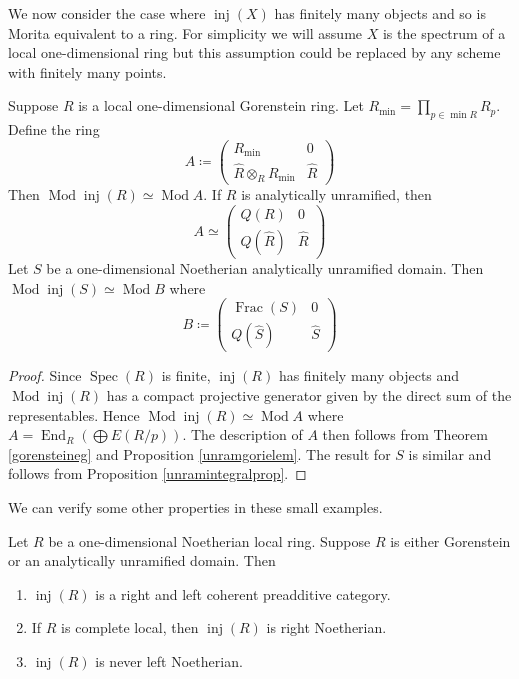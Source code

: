 \documentclass[12pt,oneside]{amsart}
\DeclareMathOperator{\End}{End}
\DeclareMathOperator{\Mod}{Mod}
\DeclareMathOperator{\inj}{inj}
\DeclareMathOperator{\Spec}{Spec}
\DeclareMathOperator{\Frac}{Frac}
\begin{document}
We now consider the case where $\inj(X)$ has finitely many objects and so is Morita equivalent to a ring. For simplicity we will assume $X$ is the spectrum of a local one-dimensional ring but this assumption could be replaced by any scheme with finitely many points. 

\begin{prop} \label{oneobjegs}
Suppose $R$ is a local one-dimensional Gorenstein ring. Let $R_{\min} = \prod_{ p \in \min{R}} R_p$. Define the ring
\[
A \coloneq \begin{pmatrix}
R_{\min} & 0 \\
\widehat{R} \otimes_R R_{\min} & \widehat{R} 
\end{pmatrix}
\]
Then $\Mod \inj(R) \simeq \Mod A$. If $R$ is analytically unramified, then 
\[
A \simeq \begin{pmatrix}
Q(R) & 0 \\
Q(\widehat{R}) & \widehat{R} 
\end{pmatrix}
\]
Let $S$ be a one-dimensional Noetherian analytically unramified domain. 
Then $\Mod \inj(S) \simeq \Mod B$ where
\[
B \coloneq \begin{pmatrix}
\Frac(S) & 0 \\
Q(\widehat{S}) & \widehat{S} 
\end{pmatrix}
\]

\end{prop}


\begin{proof}
Since $\Spec(R)$ is finite, $\inj(R)$ has finitely many objects and $\Mod \inj(R)$ has a compact projective generator given by the direct sum of the representables. Hence $\Mod \inj(R) \simeq \Mod A$ where $A = \End_R(\bigoplus E(R/p))$. The description of $A$ then follows from Theorem \ref{gorensteineg} and Proposition \ref{unramgorielem}. The result for $S$ is similar and follows from Proposition \ref{unramintegralprop}.
\end{proof}

We can verify some other properties in these small examples.

\begin{prop} \label{notnoetheg}
Let $R$ be a one-dimensional Noetherian local ring. Suppose $R$ is either Gorenstein or an analytically unramified domain. Then
\begin{enumerate}
\item $\inj(R)$ is a right and left coherent preadditive category.

\item If $R$ is complete local, then $\inj(R)$ is right Noetherian.

\item $\inj(R)$ is never left Noetherian.
\end{enumerate}
\end{prop}
\end{document}
